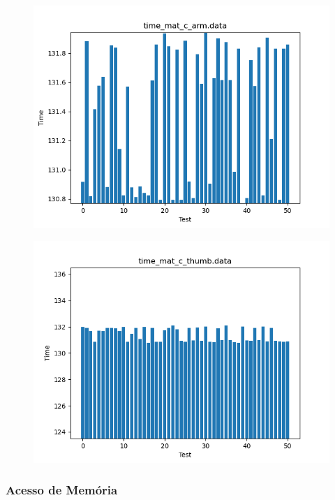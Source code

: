 \documentclass[a4paper,10pt]{article}
\begin{document}
\begin{figure}[H]
 \includegraphics[width=\linewidth]{data/time_mat_c_arm.png}
\end{figure}

\begin{figure}[H]
 \includegraphics[width=\linewidth]{data/time_mat_c_thumb.png}
\end{figure}


\subsubsection*{Acesso de Memória}
\end{document}
